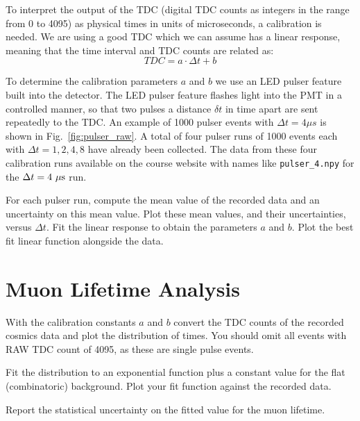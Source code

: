 To interpret the output of the TDC (digital TDC counts as integers in
the range from 0 to 4095) as physical times in units of microseconds,
a calibration is needed.  We are using a good TDC which we can assume has a linear response, meaning that the time interval and TDC counts are related as:
\begin{displaymath}
TDC = a \cdot \Delta t  + b 
\end{displaymath}

To determine the calibration parameters $a$ and $b$ we use an LED
pulser feature built into the detector.  The LED pulser feature
flashes light into the PMT in a controlled manner, so that two pulses
a distance $\delta t$ in time apart are sent repeatedly to the TDC.
An example of 1000 pulser events with $\Delta t = 4 \mu s$ is shown in
Fig.~\ref{fig:pulser_raw}.  A total of four pulser runs of 1000 events
each with $\Delta t = 1,2,4,8$ have already been collected.  The data
from these four calibration runs available on the course website with
names like {\tt pulser{\_}4.npy} for the $\Delta t = 4~\rm \mu s$ run.

\begin{plot} For each pulser run, compute the mean value of the recorded data and an uncertainty on this mean value. Plot these mean values, and their uncertainties, versus $\Delta t$.  Fit the linear response to obtain the parameters $a$ and $b$.  Plot the best fit linear function alongside the data. \end{plot}

\section{Muon Lifetime Analysis}

\begin{plot} With the calibration constants $a$ and $b$ convert the
TDC counts of the recorded cosmics data and plot the distribution of
times.  You should omit all events with RAW TDC count of 4095, as
these are single pulse events. \end{plot}

 \begin{plot}  Fit the distribution to an exponential
function plus a constant value for the flat (combinatoric) background.
Plot your fit function against the recorded data. \end{plot}

\begin{print} Report the statistical uncertainty on the fitted value for
the muon lifetime. \end{print}

